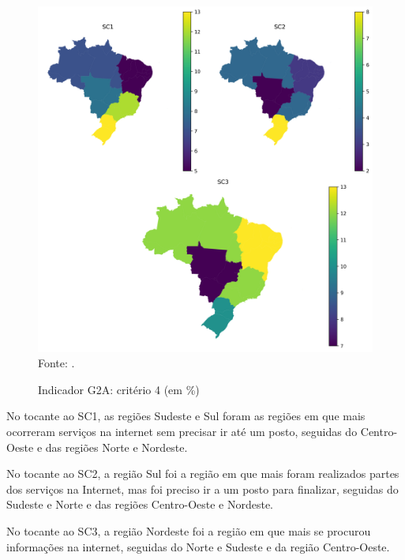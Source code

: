 \begin{figure}[H]
	\centering
	\caption{Indicador G2A: critério 4 (em \%)}
	\includegraphics[width=1\linewidth]{figuras/mapa_coropletico_tic_domicilios_2024_g2a_4.png}
	\label{fig:mapa_coropletico_tic_domicilios_2024_g2a_4}
	\footnotesize{Fonte: \cite{tic_domicilios_2024_g2a}.}
\end{figure}

No tocante ao SC1, as regiões Sudeste e Sul foram as regiões em que mais ocorreram serviços na internet sem precisar ir até um posto, seguidas do Centro-Oeste e das regiões Norte e Nordeste.

No tocante ao SC2, a região Sul foi a região em que mais foram realizados partes dos serviços na Internet, mas foi preciso ir a um posto para finalizar, seguidas do Sudeste e Norte e das regiões Centro-Oeste e Nordeste.

No tocante ao SC3, a região Nordeste foi a região em que mais se procurou informações na internet, seguidas do Norte e Sudeste e da região Centro-Oeste.

